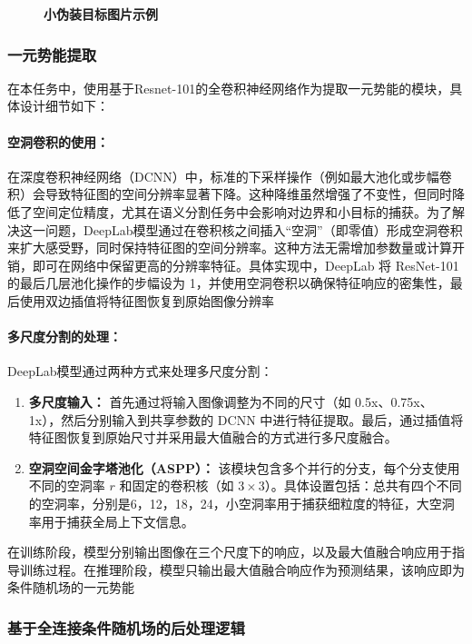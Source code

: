 \documentclass[a4paper,12pt]{ctexart}
\begin{document}
\begin{figure}
    \caption{\textbf{小伪装目标图片示例}\label{fig:small}}
\end{figure}

\subsubsection{一元势能提取}
\label{sec:unary}
在本任务中，使用基于Resnet-101的全卷积神经网络\cite{Chen2016DeepLabSI}作为提取一元势能的模块，具体设计细节如下：

\paragraph{空洞卷积的使用：}在深度卷积神经网络（DCNN）中，标准的下采样操作\cite{Shelhamer2014FullyCN}（例如最大池化或步幅卷积）会导致特征图的空间分辨率显著下降。这种降维虽然增强了不变性，但同时降低了空间定位精度，尤其在语义分割任务中会影响对边界和小目标的捕获。为了解决这一问题，DeepLab模型通过在卷积核之间插入“空洞”（即零值）形成空洞卷积来扩大感受野，同时保持特征图的空间分辨率。这种方法无需增加参数量或计算开销，即可在网络中保留更高的分辨率特征。具体实现中，DeepLab 将 ResNet-101 的最后几层池化操作的步幅设为 1，并使用空洞卷积以确保特征响应的密集性，最后使用双边插值将特征图恢复到原始图像分辨率

\paragraph{多尺度分割的处理：}DeepLab模型通过两种方式来处理多尺度分割：
\begin{enumerate}
    \item \textbf{多尺度输入：} 首先通过将输入图像调整为不同的尺寸（如 0.5x、0.75x、1x），然后分别输入到共享参数的 DCNN 中进行特征提取。最后，通过插值将特征图恢复到原始尺寸并采用最大值融合的方式进行多尺度融合。
    \item \textbf{空洞空间金字塔池化（ASPP）：} 该模块包含多个并行的分支，每个分支使用不同的空洞率 $r$ 和固定的卷积核（如 $3 \times 3$）。具体设置包括：总共有四个不同的空洞率，分别是6，12，18，24，小空洞率用于捕获细粒度的特征，大空洞率用于捕获全局上下文信息。
\end{enumerate}

在训练阶段，模型分别输出图像在三个尺度下的响应，以及最大值融合响应用于指导训练过程。在推理阶段，模型只输出最大值融合响应作为预测结果，该响应即为条件随机场的一元势能

\subsubsection{基于全连接条件随机场的后处理逻辑}
\label{sec:crf}
\end{document}
